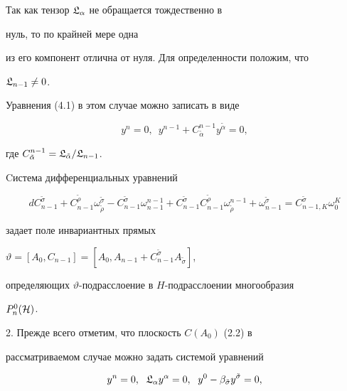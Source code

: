 Так как тензор $\frak L_\alpha$ не обращается тождественно в


нуль, то по крайней мере одна


из его компонент отлична от нуля. Для определенности положим, что


$\frak L_{n-1}\ne 0$.


Уравнения (4.1) в этом случае можно записать в виде


$$


y^n=0,\ \; y^{n-1}+C^{n-1}_{\tilde \alpha} y^{\tilde \alpha}=0,


$$


где $C^{n-1}_{\tilde \alpha}=


\frak L_{\tilde \alpha}/\frak L_{n-1}$.





Cистема дифференциальных уравнений


$$


dC^{\tilde \sigma}_{n-1}+


C^{\tilde \rho}_{n-1}\omega^{\tilde\sigma}_{\tilde\rho}-


C^{\tilde \sigma}_{n-1}\omega^{n-1}_{n-1}+


C^{\tilde \sigma}_{n-1}


C^{\tilde \rho}_{n-1}\omega^{n-1}_{\tilde \rho}+


\omega^{\tilde\sigma}_{n-1}=


C^{\tilde \sigma}_{n-1,K} \omega^K_0


$$


задает поле инвариантных прямых


$\vartheta = [A_0,C_{n-1}] =


[A_0, A_{n-1}+C^{\tilde\sigma}_{n-1} A_{\tilde\sigma}]$,


определяющих $\vartheta$-подрасслоение в $H$-подрасслоении многообразия


$P^0_n(\cal H)$.





2. Прежде всего отметим, что плоскость $C(A_0)$ (2.2) в


рассматриваемом случае можно задать системой уравнений


\begin{equation}


y^n=0,\ \; \frak L_\alpha y^{\alpha}=0,\ \;


y^0-\beta_{\tilde\sigma} y^{\tilde\sigma}=0,


\end{equation}


